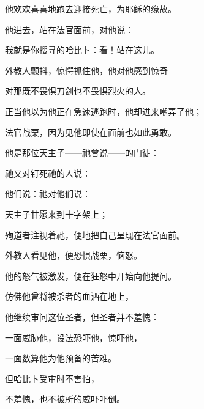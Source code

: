 他欢欢喜喜地跑去迎接死亡，为耶稣的缘故。\par

他进去，站在法官面前，对他说：\par

我就是你搜寻的哈比卜：看！站在这儿。\par

外教人颤抖，惊愕抓住他，他对他感到惊奇——\par

对那既不畏惧刀剑也不畏惧烈火的人。\par

正当他以为他正在急速逃跑时，他却进来嘲弄了他；\par

法官战栗，因为见他即使在面前也如此勇敢。\par

他是那位天主子——祂曾说——的门徒：\par

\par

祂又对钉死祂的人说：\par

他们说：祂对他们说：\par

天主子甘愿来到十字架上；\par

殉道者注视着祂，便地把自己呈现在法官面前。\par

外教人看见他，便恐惧战栗，恼怒。\par

他的怒气被激发，便在狂怒中开始向他提问。\par

仿佛他曾将被杀者的血洒在地上，\par

他继续审问这位圣者，但圣者并不羞愧：\par

一面威胁他，设法恐吓他，惊吓他，\par

一面数算他为他预备的苦难。\par

但哈比卜受审时不害怕，\par

不羞愧，也不被所的威吓吓倒。\par

